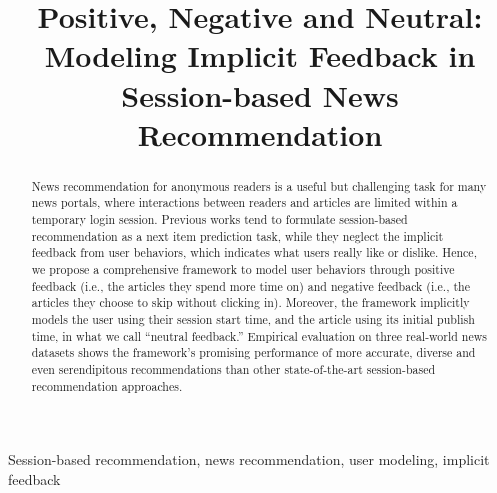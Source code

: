 \documentclass[conference]{IEEEtran}
\begin{document}
%
\title{Positive, Negative and Neutral: Modeling Implicit Feedback in 
Session-based News Recommendation}
\author{
}
\maketitle
\begin{abstract}

News recommendation for anonymous readers is a useful but challenging task for 
many news portals, where interactions between readers and articles 
are limited within a temporary login session. 
Previous works tend to formulate session-based recommendation as 
a next item prediction task, while they neglect the implicit feedback from 
user behaviors, which indicates what users really like or dislike. 
Hence, we propose a comprehensive framework to model user behaviors
through positive feedback (i.e., the articles they spend more time on) and
negative feedback (i.e., the articles they choose to skip without clicking in).
Moreover, the framework implicitly models the user using their session start
time, and the article using its initial publish time, in what we call ``neutral
feedback.''
Empirical evaluation on three real-world news datasets shows 
the framework's promising performance of more accurate, diverse and even 
serendipitous recommendations than other state-of-the-art 
session-based recommendation approaches.
\end{abstract}

\begin{IEEEkeywords}
    Session-based recommendation, news recommendation, user modeling, implicit feedback
\end{IEEEkeywords}








\normalem


\end{document}
